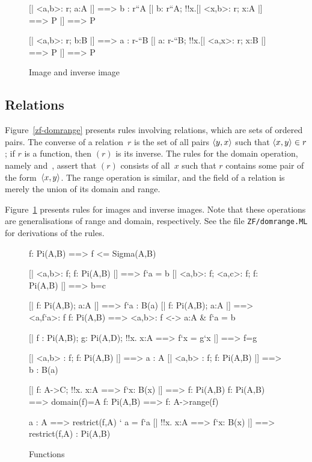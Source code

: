 \begin{figure}
\begin{ttbox}
         [| <a,b>: r;  a:A |] ==> b : r``A
         [| b: r``A;  !!x.[| <x,b>: r;  x:A |] ==> P |] ==> P

        [| <a,b>: r;  b:B |] ==> a : r-``B
        [| a: r-``B;  !!x.[| <a,x>: r;  x:B |] ==> P |] ==> P
\end{ttbox}
\caption{Image and inverse image} \label{zf-domrange2}
\end{figure}


\subsection{Relations}
Figure~\ref{zf-domrange} presents rules involving relations, which are sets
of ordered pairs.  The converse of a relation~$r$ is the set of all pairs
$\langle y,x\rangle$ such that $\langle x,y\rangle\in r$; if $r$ is a function, then
{$(r)$} is its inverse.  The rules for the domain
operation, namely  and~, assert that
$(r)$ consists of all~$x$ such that $r$ contains
some pair of the form~$\langle x,y\rangle$.  The range operation is similar, and
the field of a relation is merely the union of its domain and range.  

Figure~\ref{zf-domrange2} presents rules for images and inverse images.
Note that these operations are generalisations of range and domain,
respectively.  See the file \texttt{ZF/domrange.ML} for derivations of the
rules.



\begin{figure}
\begin{ttbox}
      f: Pi(A,B) ==> f <= Sigma(A,B)

  [| <a,b>: f;  f: Pi(A,B) |] ==> f`a = b
 [| <a,b>: f;  <a,c>: f;  f: Pi(A,B) |] ==> b=c

      [| f: Pi(A,B);  a:A |] ==> f`a : B(a)
      [| f: Pi(A,B);  a:A |] ==> <a,f`a>: f
       f: Pi(A,B) ==> <a,b>: f <-> a:A & f`a = b

   [| f : Pi(A,B);  g: Pi(A,D);
                   !!x. x:A ==> f`x = g`x     |] ==> f=g

     [| <a,b> : f;  f: Pi(A,B) |] ==> a : A
      [| <a,b> : f;  f: Pi(A,B) |] ==> b : B(a)

         [| f: A->C;  !!x. x:A ==> f`x: B(x) |] ==> f: Pi(A,B)
   f: Pi(A,B) ==> domain(f)=A
    f: Pi(A,B) ==> f: A->range(f)

        a : A ==> restrict(f,A) ` a = f`a
   [| !!x. x:A ==> f`x: B(x) |] ==> 
                restrict(f,A) : Pi(A,B)
\end{ttbox}
\caption{Functions} \label{zf-func1}
\end{figure}


